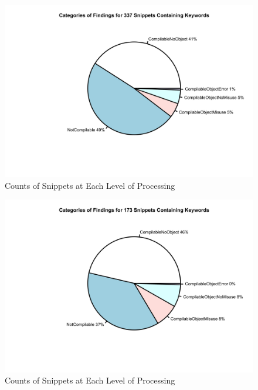 \documentclass[10pt, conference]{IEEEtran}
\begin{document}
\begin{figure}[h]
\begin{center}
\includegraphics[width=0.9\linewidth]{PiePartialMatchFull.png}
\caption{Counts of Snippets at Each Level of Processing}
\end{center}
\end{figure}

\begin{figure}[h]
\begin{center}
\includegraphics[width=1.0\linewidth]{PiePureMatchFull.png}
\caption{Counts of Snippets at Each Level of Processing}
\end{center}
\end{figure}
\end{document}
